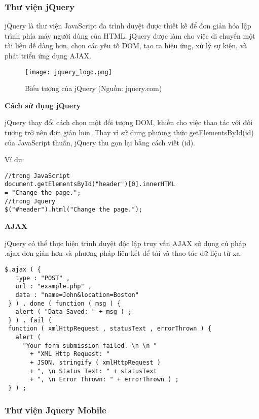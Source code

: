 \subsubsection{Thư viện jQuery}

jQuery là thư viện JavaScript đa trình duyệt được thiết kế để đơn giản hóa lập trình phía máy người dùng của HTML. jQuery được làm cho việc di chuyển một tài liệu dễ dàng hơn, chọn các yếu tố DOM, tạo ra hiệu ứng, xử lý sự kiện, và phát triển ứng dụng AJAX.

\begin{figure}[!htb] 
\centering
\texttt{[image: jquery\_logo.png]}
\caption{Biểu tượng của jQuery (Nguồn: jquery.com)}
\end{figure}

\textbf{Cách sử dụng jQuery}

jQuery thay đổi cách chọn một đối tượng DOM, khiến cho việc thao tác với đối tượng trở nên đơn giản hơn. Thay vì sử dụng phương thức getElementsById(id) của JavaScript thuần, jQuery thu gọn lại bằng cách viết \textdollar(id).

Ví dụ:

\begin{lstlisting}
//trong JavaScript
document.getElementsById("header")[0].innerHTML 
= "Change the page.";
//trong Jquery
$("#header").html("Change the page.");
\end{lstlisting}

\textbf{AJAX}

jQuery có thể thực hiện trình duyệt độc lập truy vấn AJAX sử dụng cú pháp \textdollar.ajax đơn giản hơn và phương pháp liên kết để tải và thao tác dữ liệu từ xa.

\begin{lstlisting}
$.ajax ( {
   type : "POST" ,
   url : "example.php" ,
   data : "name=John&location=Boston"
 } ) . done ( function ( msg ) {
   alert ( "Data Saved: " + msg ) ;
 } ) . fail ( 
 function ( xmlHttpRequest , statusText , errorThrown ) {
   alert (
     "Your form submission failed. \n \n "
       + "XML Http Request: " 
       + JSON. stringify ( xmlHttpRequest )
       + ", \n Status Text: " + statusText
       + ", \n Error Thrown: " + errorThrown ) ;
 } ) ;
\end{lstlisting}

\subsubsection{Thư viện Jquery Mobile}

